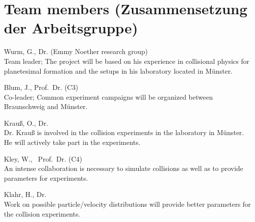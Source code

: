 \section{Team members (Zusammensetzung der Arbeitsgruppe)}
%
%
\begin{teamlist}
\item[Wurm, G., Dr. (Emmy Noether research group)]\mbox{}\\
Team leader; The project will be based on his experience in collisional physics for
planetesimal formation and the setups in his laboratory located in M\"unster.
\item[Blum, J., Prof.~Dr. (C3)]\mbox{}\\
Co-leader; Common experiment campaigns will be organized between Braunschweig and M\"unster.
\item[Krau{\ss}, O., Dr.]\mbox{}\\
Dr. Krau{\ss} is involved in the collision experiments in the laboratory in M\"unster.
He will actively take part in the experiments.
\item[Kley, W., ~Prof.~Dr. (C4)]\mbox{}\\
An intense collaboration is necessary to simulate collisions as well as to provide parameters
for experiments.
\item[Klahr, H., Dr.]\mbox{}\\
Work on possible particle/velocity distributions will provide better parameters for the
collision experiments.
\end{teamlist}
\vspace{1em}



